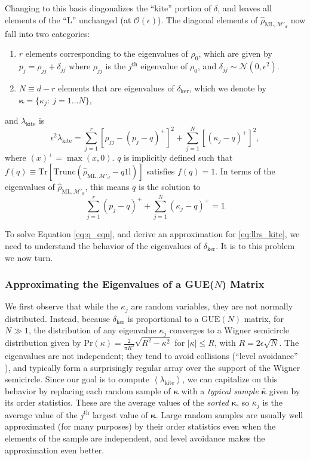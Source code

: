 \documentclass[aps,pra, twocolumn]{revtex4-1}
\newcommand{\M}{\mathcal{M}}
\newcommand{\Tr}{\mathrm{Tr}}
\newcommand{\Id}{\mathbb{I}}
\newcommand{\expect}[1]{\ensuremath{\left\langle#1\right\rangle}}
\def\Id{1\!\mathrm{l}}
\newcommand{\bvec}[1]{\boldsymbol{#1}}
\newcommand{\rhohat}{\hat{\rho}}
\newcommand{\rhoML}[1]{\rhohat_{\scriptscriptstyle{\mathrm{ML},#1}}}
\begin{document}
Changing to this basis diagonalizes the ``kite'' portion of $\delta$, and leaves all elements of the ``L'' unchanged (at $\mathcal{O}(\epsilon)$).  The diagonal elements of $\rhoML{\M'_{d}}$ now fall into two categories:
\begin{enumerate}[noitemsep]
\item $r$ elements corresponding to the eigenvalues of $\rho_0$, which are given by $p_{j} = \rho_{jj} + \delta_{jj}$ where  $\rho_{jj}$ is the $j^{\mathrm{th}}$ eigenvalue of $\rho_{0}$, and $\delta_{jj} \sim \mathcal{N}(0,\epsilon^2)$.
\item $N \equiv d-r$ elements that are eigenvalues of $\delta_{\mathrm{ker}}$, which we denote by $\bvec{\kappa} = \{\kappa_j:~j = 1\ldots 
N\}$,
\end{enumerate}
and $\lambda_{\mathrm{kite}}$ is
\begin{equation}
\label{eq:llrs_kite}
\epsilon^{2}\lambda_{\mathrm{kite}} = \sum_{j=1}^{r}[\rho_{jj}- (p_j-q)^{+}]^2 + \sum_{j=1}^{N}\left[(\kappa_j-q)^+\right]^2,
\end{equation}
where $(x)^{+} = \max(x, 0)$. $q$ is implicitly defined such that $f(q) \equiv \Tr\left[\mathrm{Trunc}(\rhoML{\M'_{d}} - q \Id)\right]$ satisfies $f(q) = 1$. In terms of the eigenvalues of $\rhoML{\M'_{d}}$, this means $q$ is the solution to
\begin{equation}
\label{eq:q_eqn}
 \sum_{j=1}^{r}(p_j - q)^{+} + \sum_{j=1}^{N}{(\kappa_j-q)^+} = 1
\end{equation}

To solve Equation \eqref{eq:q_eqn}, and derive an approximation for \eqref{eq:llrs_kite}, we need to understand the behavior of the eigenvalues of $\delta_{\mathrm{ker}}$. It is to this problem we now turn.

\subsubsection{Approximating the Eigenvalues of a GUE($N$) Matrix}
We first observe that while the $\kappa_j$ are random variables, they are not normally distributed.  Instead, because $\delta_{\mathrm{ker}}$ is proportional to a $\mathrm{GUE}(N)$ matrix, for $N\gg1$, the distribution of any eigenvalue $\kappa_{j}$
converges to a Wigner semicircle distribution \cite{Wigner1958} given by $\mathrm{Pr}(\kappa) = \frac{2}{\pi R^{2}}\sqrt{R^{2}-\kappa^{2}}$ for $|\kappa| \leq R$, with $R = 2\epsilon\sqrt{N}$.  The eigenvalues are not independent; they tend to avoid collisions (``level avoidance'' \cite{Tao2013}), 
and typically form a surprisingly regular array over the support of the Wigner semicircle.  Since our goal is to compute $\expect{\lambda_{\mathrm{kite}}}$, we can capitalize on this behavior by replacing each random sample of $\bvec{\kappa}$ with a 
\emph{typical sample} $\bar{\bvec{\kappa}}$ given by its order statistics.  These are the average values of the \emph{sorted} 
$\bvec{\kappa}$, so $\overline{\kappa}_j$ is the average value of the $j^{\mathrm{th}}$ largest value of $\bvec{\kappa}$.  Large random samples 
are usually well approximated (for many purposes) by their order statistics even when the elements of the sample are 
independent, and level avoidance makes the approximation even better. 
\end{document}
